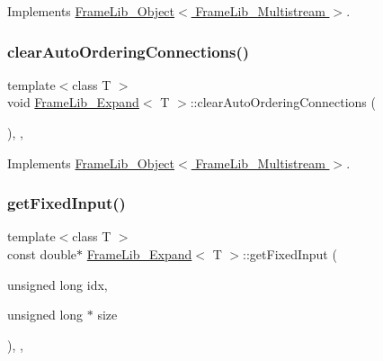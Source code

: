 Implements \hyperlink{class_frame_lib___object_abd8e6ba645082041000b7a0b67c9b011}{Frame\+Lib\+\_\+\+Object$<$ Frame\+Lib\+\_\+\+Multistream $>$}.

\mbox{\label{class_frame_lib___expand_a1fc74f5aa29990019307078693016f78}} 
\subsubsection{\texorpdfstring{clear\+Auto\+Ordering\+Connections()}{clearAutoOrderingConnections()}}
{\footnotesize\ttfamily template$<$class T $>$ \\
void \hyperlink{class_frame_lib___expand}{Frame\+Lib\+\_\+\+Expand}$<$ T $>$\+::clear\+Auto\+Ordering\+Connections (\begin{DoxyParamCaption}{ }\end{DoxyParamCaption})\hspace{0.3cm}{\ttfamily [inline]}, {\ttfamily [override]}, {\ttfamily [virtual]}}



Implements \hyperlink{class_frame_lib___object_aac43ebfacb59081f7f60957380df7481}{Frame\+Lib\+\_\+\+Object$<$ Frame\+Lib\+\_\+\+Multistream $>$}.

\mbox{\label{class_frame_lib___expand_aea5cb729f1e2e69c5db41b53a991e0c6}} 
\subsubsection{\texorpdfstring{get\+Fixed\+Input()}{getFixedInput()}}
{\footnotesize\ttfamily template$<$class T $>$ \\
const double$\ast$ \hyperlink{class_frame_lib___expand}{Frame\+Lib\+\_\+\+Expand}$<$ T $>$\+::get\+Fixed\+Input (\begin{DoxyParamCaption}\item[{unsigned long}]{idx,  }\item[{unsigned long $\ast$}]{size }\end{DoxyParamCaption})\hspace{0.3cm}{\ttfamily [inline]}, {\ttfamily [override]}, {\ttfamily [virtual]}}



